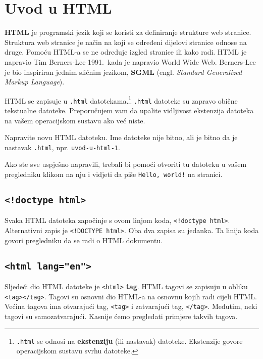 \newpage
\section{Uvod u HTML}\label{sec:uvod-u-html}

\textbf{HTML} je programski jezik koji se koristi za definiranje strukture web stranice.
Struktura web stranice je način na koji se određeni dijelovi stranice odnose na druge.
Pomoću HTML-a se ne odreduje izgled stranice ili kako radi.
HTML je napravio Tim Berners-Lee 1991.\ kada je napravio World Wide Web.
Berners-Lee je bio inspiriran jednim sličnim jezikom, \textbf{SGML} (engl. \textit{Standard Generalized Markup Language}).

HTML se zapisuje u \verb|.html| datotekama.\footnote{\texttt{.html} se odnosi na \textbf{ekstenziju} (ili nastavak) datoteke. Ekstenzije govore operacijskom sustavu svrhu datoteke.}
\verb|.html| datoteke su zapravo obične tekstualne datoteke.
Preporučujem vam da upalite vidljivost ekstenzija datoteka na vašem operacijskom sustavu ako već niste.

Napravite novu HTML datoteku.
Ime datoteke nije bitno, ali je bitno da je nastavak \verb|.html|, npr. \verb|uvod-u-html-1|.



Ako ste sve uspješno napravili, trebali bi pomoći otvoriti tu datoteku u vašem pregledniku klikom na nju i vidjeti da piše \verb|Hello, world!| na stranici.

\subsection{\texttt{<!doctype html>}}\label{subsec:doctype-html}

Svaka HTML datoteka započinje s ovom linjom koda, \verb|<!doctype html>|.
Alternativni zapis je \verb|<!DOCTYPE html>|.
Oba dva zapisa su jedanka.
Ta linija koda govori pregledniku da se radi o HTML dokumentu.

\subsection{\texttt{<html lang="en">}}\label{subsec:html}

Sljedeći dio HTML datoteke je \lstinline!<html>! \textbf{tag}.
HTML tagovi se zapisuju u obliku \lstinline!<tag></tag>!.
Tagovi su osnovni dio HTML-a na osnovnu kojih radi cijeli HTML.
Većina tagova ima otvarajući tag, \lstinline!<tag>! i zatvarajući tag, \lstinline!</tag>!.
Međutim, neki tagovi su samozatvarajući.
Kasnije ćemo pregledati primjere takvih tagova.

